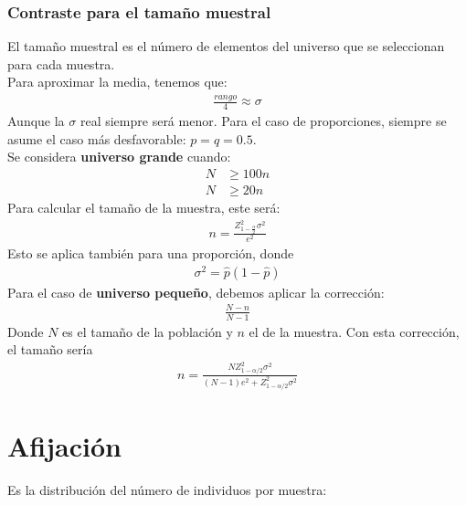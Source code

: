 \documentclass{article}
\begin{document}
\subsubsection{Contraste para el tamaño muestral}
El tamaño muestral es el número de elementos del universo que se seleccionan para cada muestra.\\
Para aproximar la media, tenemos que:
\begin{equation}
    \begin{split}
        \frac{rango}{4} \approx \sigma 
    \end{split}
\end{equation}
Aunque la $\sigma $ real siempre será menor. Para el caso de proporciones, siempre se asume el caso más
desfavorable: $p=q=0.5$.\\
Se considera \textbf{universo grande} cuando:
\begin{equation}
    \begin{split}
        N &\geq 100n\\
        N &\geq 20n
    \end{split}
\end{equation}
Para calcular el tamaño de la muestra, este será:
\begin{equation}
    \begin{split}
        \boxed{n = \frac{Z^{2}_{1-\frac{\alpha}{2} }\sigma^{2}}{e^{2}}}
    \end{split}
\end{equation}
Esto se aplica también para una proporción, donde
\begin{equation}
    \begin{split}
        \sigma^{2} = \hat{p}(1-\hat{p})
    \end{split}
\end{equation}
Para el caso de \textbf{universo pequeño}, debemos aplicar la corrección:
\begin{equation}
    \begin{split}
        \frac{N-n}{N-1}
    \end{split}
\end{equation}
Donde $N$ es el tamaño de la población y $n$ el de la muestra. Con esta corrección, el tamaño
sería
\begin{equation}
    \begin{split}
        \boxed{n = \frac{N Z^{2}_{1-\alpha /2} \sigma^{2}}{(N-1)e^{2}+Z^{2}_{1-\alpha /2}\sigma^{2}}}
    \end{split}
\end{equation}
\section{Afijación}
Es la distribución del número de individuos por muestra:
\end{document}
